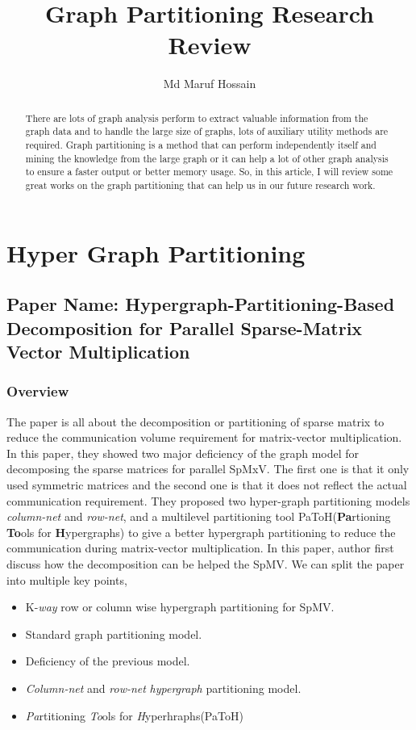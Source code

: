 \documentclass[conference, onecolumn]{IEEEtran}
\begin{document}
\title{Graph Partitioning Research Review}


\author{Md Maruf Hossain}

\maketitle

\begin{abstract}
There are lots of graph analysis perform to extract valuable information from the graph data and to handle the large 
size of graphs, lots of auxiliary utility methods are required. Graph partitioning is a method that can perform 
independently itself and mining the knowledge from the large graph or it can help a lot of other graph analysis to 
ensure a faster output or better memory usage. So, in this article, I will review some great works on the graph partitioning 
that can help us in our future research work.    
\end{abstract}

\section{Hyper Graph Partitioning}
\subsection{Paper Name: Hypergraph-Partitioning-Based Decomposition for Parallel Sparse-Matrix Vector Multiplication} 

\subsubsection{Overview}
The paper is all about the decomposition or partitioning of sparse matrix to reduce the communication volume requirement for 
matrix-vector multiplication. In this paper, they showed two major deficiency of the graph model for decomposing the sparse matrices 
for parallel SpMxV. The first one is that it only used symmetric matrices and the second one is that it does not reflect the 
actual communication requirement. They proposed two hyper-graph partitioning models \textit{column-net} and \textit{row-net}, and 
a multilevel partitioning tool PaToH(\textbf{Pa}rtioning \textbf{To}ols for \textbf{H}ypergraphs) to give a better hypergraph 
partitioning to reduce the communication during matrix-vector multiplication. In this paper, author first discuss how the decomposition 
can be helped the SpMV. We can split the paper into multiple key points,
\begin{itemize}
\item K-\textit{way} row or column wise hypergraph partitioning for SpMV.
\item Standard graph partitioning model.
\item Deficiency of the previous model.
\item \textit{Column-net} and \textit{row-net} \textit{hypergraph} partitioning model.
\item \textit{Pa}rtitioning \textit{To}ols for \textit{H}yperhraphs(PaToH)
\end{itemize}
\end{document}
